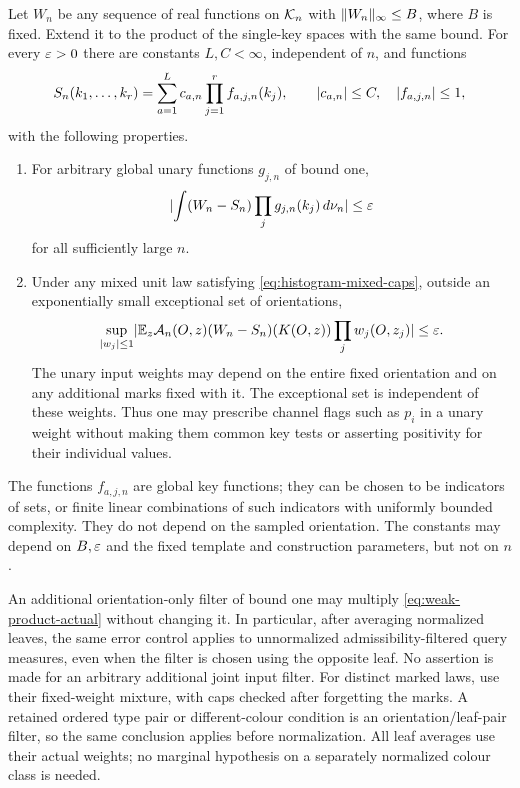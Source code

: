 \begin{theorem}\label{thm:weak-product}
Let $W_n$ be any sequence of real functions on $\mathcal K_n$ with
$\lVert W_n\rVert_\infty\le B$, where $B$ is fixed. Extend it to the product
of the single-key spaces with the same bound. For every $\varepsilon>0$
there are constants $L,C<\infty$, independent of $n$, and functions
\begin{equation}\label{eq:weak-product-approximant}
 S_n(k_1,\ldots,k_r)
   =\sum_{a=1}^{L}c_{a,n}\prod_{j=1}^{r}f_{a,j,n}(k_j),
 \qquad
 \lvert c_{a,n}\rvert\le C,\quad \lvert f_{a,j,n}\rvert\le1,
\end{equation}
with the following properties.
\begin{enumerate}[label=(\roman*)]
\item For arbitrary global unary functions $g_{j,n}$ of bound one,
\begin{equation}\label{eq:weak-product-reference}
 \lvert \int(W_n-S_n)\prod_jg_{j,n}(k_j)\,d\nu_n\rvert\le\varepsilon
\end{equation}
for all sufficiently large $n$.
\item Under any mixed unit law satisfying
\eqref{eq:histogram-mixed-caps}, outside an exponentially small
exceptional set of orientations,
\begin{equation}\label{eq:weak-product-actual}
 \sup_{\lvert w_j\rvert\le1}
 \lvert \mathbb E_z\mathcal A_n(O,z)
       (W_n-S_n)(K(O,z))\prod_jw_j(O,z_j)\rvert\le\varepsilon.
\end{equation}
The unary input weights may depend on the entire fixed orientation
and on any additional marks fixed with it. The exceptional set is
independent of these weights. Thus one may prescribe channel flags
such as $p_i$ in a unary weight without making them common key tests
or asserting positivity for their individual values.
\end{enumerate}
The functions $f_{a,j,n}$ are global key functions; they can be chosen
to be indicators of sets, or finite linear combinations of such
indicators with uniformly bounded complexity. They do not depend on
the sampled orientation. The constants may depend on $B,\varepsilon$ and
the fixed template and construction parameters, but not on $n$.

An additional orientation-only filter of bound one may multiply
\eqref{eq:weak-product-actual} without changing it. In particular,
after averaging normalized leaves, the same error control applies to
unnormalized admissibility-filtered query measures, even when the
filter is chosen using the opposite leaf. No assertion is made for
an arbitrary additional joint input filter.
For distinct marked laws, use their fixed-weight mixture, with caps
checked after forgetting the marks. A retained ordered type pair or
different-colour condition is an orientation/leaf-pair filter, so the
same conclusion applies before normalization. All leaf averages use
their actual weights; no marginal hypothesis on a separately
normalized colour class is needed.
\end{theorem}

